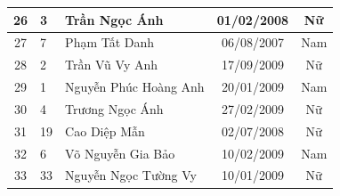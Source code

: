 \begin{longtable}{|c|l|p{6cm}|c|c|}
\hline
26 & 3 & Trần Ngọc Ánh & 01/02/2008 & Nữ \\
\hline
27 & 7 & Phạm Tất Danh & 06/08/2007 & Nam \\
\hline
28 & 2 & Trần Vũ Vy Anh & 17/09/2009 & Nữ \\
\hline
29 & 1 & Nguyễn Phúc Hoàng Anh & 20/01/2009 & Nam \\
\hline
30 & 4 & Trương Ngọc Ánh & 27/02/2009 & Nữ \\
\hline
31 & 19 & Cao Diệp Mẫn & 02/07/2008 & Nữ \\
\hline
32 & 6 & Võ Nguyễn Gia Bảo & 10/02/2009 & Nam \\
\hline
33 & 33 & Nguyễn Ngọc Tường Vy & 10/01/2009 & Nữ \\
\hline
\end{longtable}
